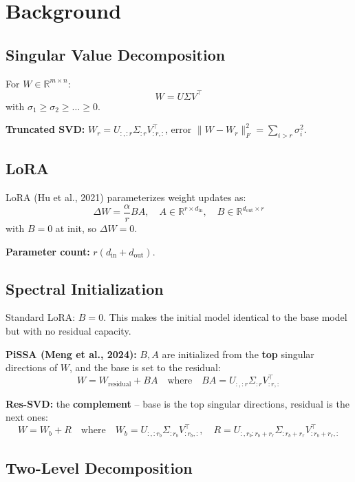 \section{Background}

\subsection{Singular Value Decomposition}

For $W \in \mathbb{R}^{m \times n}$:
\[
W = U \Sigma V^\top
\tag{3.1}
\]
with $\sigma_1 \geq \sigma_2 \geq \dots \geq 0$.

\textbf{Truncated SVD:} $W_r = U_{:, :r} \Sigma_{:r} V_{:r, :}^\top$, error 
$\|W - W_r\|_F^2 = \sum_{i > r} \sigma_i^2$.

\subsection{LoRA}

LoRA (Hu et al., 2021) parameterizes weight updates as:
\[
\Delta W = \frac{\alpha}{r} B A, \quad A \in \mathbb{R}^{r \times d_\text{in}}, \quad B \in \mathbb{R}^{d_\text{out} \times r}
\tag{3.2}
\]
with $B = 0$ at init, so $\Delta W = 0$.

\textbf{Parameter count:} $r(d_\text{in} + d_\text{out})$.

\subsection{Spectral Initialization}

Standard LoRA: $B = 0$. This makes the initial model identical to the 
base model but with no residual capacity.

\textbf{PiSSA (Meng et al., 2024):} $B, A$ are initialized from the \textbf{top} 
singular directions of $W$, and the base is set to the residual:
\[
W = W_\text{residual} + B A \quad \text{where} \quad B A = U_{:, :r} \Sigma_{:r} V_{:r, :}^\top
\tag{3.3}
\]

\textbf{Res-SVD:} the \textbf{complement} -- base is the top singular directions, 
residual is the next ones:
\[
W = W_b + R \quad \text{where} \quad W_b = U_{:, :r_b} \Sigma_{:r_b} V_{:r_b, :}^\top, \quad R = U_{:, r_b:r_b+r_r} \Sigma_{:r_b+r_r} V_{:r_b+r_r, :}^\top
\tag{3.4}
\]

\subsection{Two-Level Decomposition}

